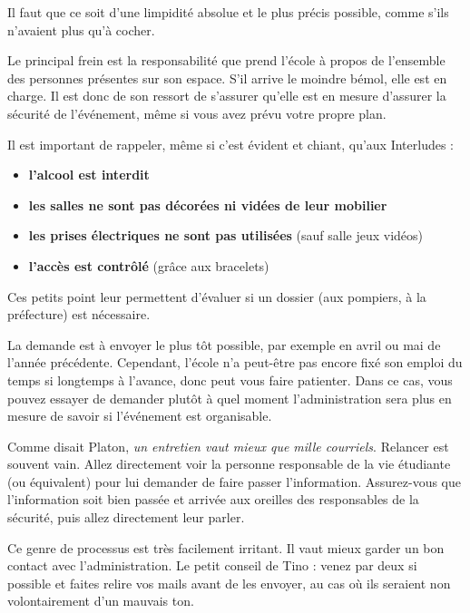 Il faut que ce soit d'une limpidité absolue et le plus précis possible, comme s'ils n'avaient plus qu'à cocher.

Le principal frein est la responsabilité que prend l'école à propos de l'ensemble des personnes présentes sur son espace. S'il arrive le moindre bémol, elle est en charge. Il est donc de son ressort de s'assurer qu'elle est en mesure d'assurer la sécurité de l'événement, même si vous avez prévu votre propre plan.

\begin{Afaire}{}{}
Il est important de rappeler, même si c'est évident et chiant, qu'aux Interludes :
\begin{itemize}
    \item \textbf{l'alcool est interdit}
    \item \textbf{les salles ne sont pas décorées ni vidées de leur mobilier}
    \item \textbf{les prises électriques ne sont pas utilisées} (sauf salle jeux vidéos)
    \item \textbf{l'accès est contrôlé}  (grâce aux bracelets)
\end{itemize}
Ces petits point leur permettent d'évaluer si un dossier (aux pompiers, à la préfecture) est nécessaire.
\end{Afaire}

La demande est à envoyer le plus tôt possible, par exemple en avril ou mai de l'année précédente. Cependant, l'école n'a peut-être pas encore fixé son emploi du temps si longtemps à l'avance, donc peut vous faire patienter. Dans ce cas, vous pouvez essayer de demander plutôt à quel moment l'administration sera plus en mesure de savoir si l'événement est organisable.

\begin{Attention}{}{}
Comme disait Platon, \emph{un entretien vaut mieux que mille courriels}. Relancer est souvent vain. Allez directement voir la personne responsable de la vie étudiante (ou équivalent) pour lui demander de faire passer l'information. Assurez-vous que l'information soit bien passée et arrivée aux oreilles des responsables de la sécurité, puis allez directement leur parler.
\end{Attention}

\begin{Attention}{}{}
Ce genre de processus est très facilement irritant. Il vaut mieux garder un bon contact avec l'administration. Le petit conseil de Tino : venez par deux si possible et faites relire vos mails avant de les envoyer, au cas où ils seraient non volontairement d'un mauvais ton.
\end{Attention}

